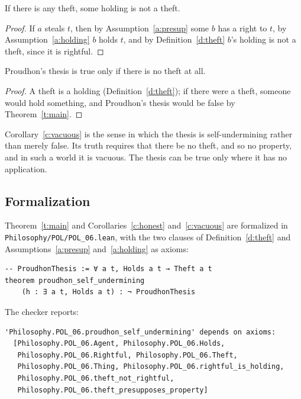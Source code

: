 \documentclass{situationist-preprint}
\begin{document}
\begin{corollary}\label{c:honest}
If there is any theft, some holding is not a theft.
\end{corollary}

\begin{proof}
If $a$ steals $t$, then by Assumption~\ref{a:presup} some $b$ has a right to $t$, by Assumption~\ref{a:holding} $b$ holds $t$, and by Definition~\ref{d:theft} $b$'s holding is not a theft, since it is rightful.
\end{proof}

\begin{corollary}\label{c:vacuous}
Proudhon's thesis is true only if there is no theft at all.
\end{corollary}

\begin{proof}
A theft is a holding (Definition~\ref{d:theft}); if there were a theft, someone would hold something, and Proudhon's thesis would be false by Theorem~\ref{t:main}.
\end{proof}

Corollary~\ref{c:vacuous} is the sense in which the thesis is self-undermining rather than merely false. Its truth requires that there be no theft, and so no property, and in such a world it is vacuous. The thesis can be true only where it has no application.

\subsection{Formalization}

Theorem~\ref{t:main} and Corollaries~\ref{c:honest} and~\ref{c:vacuous} are formalized in \nolinkurl{Philosophy/POL/POL_06.lean}, with the two clauses of Definition~\ref{d:theft} and Assumptions~\ref{a:presup} and~\ref{a:holding} as axioms:

\begin{lstlisting}
-- ProudhonThesis := ∀ a t, Holds a t → Theft a t
theorem proudhon_self_undermining
    (h : ∃ a t, Holds a t) : ¬ ProudhonThesis
\end{lstlisting}

The checker reports:

\begin{lstlisting}
'Philosophy.POL_06.proudhon_self_undermining' depends on axioms:
  [Philosophy.POL_06.Agent, Philosophy.POL_06.Holds,
   Philosophy.POL_06.Rightful, Philosophy.POL_06.Theft,
   Philosophy.POL_06.Thing, Philosophy.POL_06.rightful_is_holding,
   Philosophy.POL_06.theft_not_rightful,
   Philosophy.POL_06.theft_presupposes_property]
\end{lstlisting}
\end{document}
